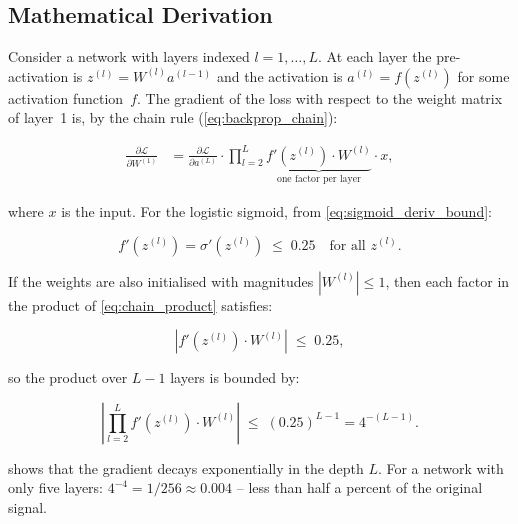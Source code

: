 \documentclass[12pt,a4paper]{article}
\newcommand{\sigmoid}{\sigma}
\newcommand{\Loss}{\mathcal{L}}
\begin{document}
\subsection{Mathematical Derivation}
\label{subsec:math_derivation}

Consider a network with layers indexed $l = 1, \ldots, L$.  At each
layer the pre-activation is $z^{(l)} = W^{(l)} a^{(l-1)}$ and the
activation is $a^{(l)} = f(z^{(l)})$ for some activation function~$f$.
The gradient of the loss with respect to the weight matrix of layer~1
is, by the chain rule (\cref{eq:backprop_chain}):

\begin{align}
  \frac{\partial \Loss}{\partial W^{(1)}}
  &= \frac{\partial \Loss}{\partial a^{(L)}}
     \cdot \prod_{l=2}^{L}
           \underbrace{f'(z^{(l)}) \cdot W^{(l)}}_{\text{one factor per layer}}
     \cdot x,
  \label{eq:chain_product}
\end{align}

where $x$ is the input.  For the logistic sigmoid, from
\cref{eq:sigmoid_deriv_bound}:

\begin{equation}
  f'(z^{(l)}) = \sigmoid'(z^{(l)}) \;\leq\; 0.25
  \quad \text{for all } z^{(l)}.
  \label{eq:sigmoid_max_deriv}
\end{equation}

If the weights are also initialised with magnitudes $|W^{(l)}| \leq 1$,
then each factor in the product of \cref{eq:chain_product} satisfies:

\begin{equation}
  \left| f'(z^{(l)}) \cdot W^{(l)} \right| \;\leq\; 0.25,
\end{equation}

so the product over $L-1$ layers is bounded by:

\begin{equation}
  \left| \prod_{l=2}^{L} f'(z^{(l)}) \cdot W^{(l)} \right|
  \;\leq\; (0.25)^{L-1}
  = 4^{-(L-1)}.
  \label{eq:exponential_decay}
\end{equation}

 shows that the gradient decays
exponentially in the depth $L$.  For a network with only five layers:
$4^{-4} = 1/256 \approx 0.004$ -- less than half a percent of the
original signal.
\end{document}
